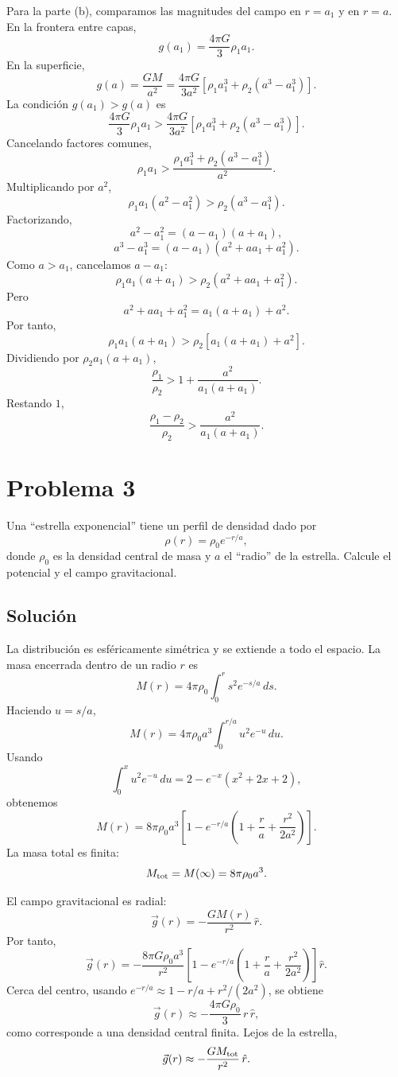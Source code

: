 \documentclass[a4paper]{article}
\begin{document}
Para la parte (b), comparamos las magnitudes del campo en $r=a_1$ y en $r=a$. En la frontera entre capas,
$$
g(a_1)=\frac{4\pi G}{3}\rho_1 a_1.
$$
En la superficie,
$$
g(a)=\frac{GM}{a^2}
=
\frac{4\pi G}{3a^2}
\left[
\rho_1 a_1^3+\rho_2(a^3-a_1^3)
\right].
$$
La condición $g(a_1)>g(a)$ es
$$
\frac{4\pi G}{3}\rho_1 a_1
>
\frac{4\pi G}{3a^2}
\left[
\rho_1 a_1^3+\rho_2(a^3-a_1^3)
\right].
$$
Cancelando factores comunes,
$$
\rho_1 a_1
>
\frac{\rho_1 a_1^3+\rho_2(a^3-a_1^3)}{a^2}.
$$
Multiplicando por $a^2$,
$$
\rho_1 a_1(a^2-a_1^2)
>
\rho_2(a^3-a_1^3).
$$
Factorizando,
$$
a^2-a_1^2=(a-a_1)(a+a_1),
$$
$$
a^3-a_1^3=(a-a_1)(a^2+a a_1+a_1^2).
$$
Como $a>a_1$, cancelamos $a-a_1$:
$$
\rho_1 a_1(a+a_1)
>
\rho_2(a^2+a a_1+a_1^2).
$$
Pero
$$
a^2+a a_1+a_1^2=a_1(a+a_1)+a^2.
$$
Por tanto,
$$
\rho_1 a_1(a+a_1)
>
\rho_2\left[a_1(a+a_1)+a^2\right].
$$
Dividiendo por $\rho_2 a_1(a+a_1)$,
$$
\frac{\rho_1}{\rho_2}
>
1+\frac{a^2}{a_1(a+a_1)}.
$$
Restando $1$,
$$
\boxed{
\frac{\rho_1-\rho_2}{\rho_2}
>
\frac{a^2}{a_1(a+a_1)}
}.
$$


\section{Problema 3}

Una “estrella exponencial” tiene un perfil de densidad dado por
$$
\rho(r)=\rho_0 e^{-r/a},
$$
donde $\rho_0$ es la densidad central de masa y $a$ el “radio” de la estrella. Calcule el potencial y el campo gravitacional.

\subsection{Solución}
La distribución es esféricamente simétrica y se extiende a todo el espacio. La masa encerrada dentro de un radio $r$ es
$$
M(r)=4\pi\rho_0\int_0^r s^2 e^{-s/a}\,ds.
$$
Haciendo $u=s/a$,
$$
M(r)=4\pi\rho_0 a^3\int_0^{r/a} u^2 e^{-u}\,du.
$$
Usando
$$
\int_0^x u^2 e^{-u}\,du
=
2-e^{-x}(x^2+2x+2),
$$
obtenemos
$$
M(r)
=
8\pi\rho_0 a^3
\left[
1-e^{-r/a}
\left(
1+\frac{r}{a}+\frac{r^2}{2a^2}
\right)
\right].
$$
La masa total es finita:
$$
M_{\rm tot}=M(\infty)=8\pi\rho_0 a^3.
$$

El campo gravitacional es radial:
$$
\vec g(r)=-\frac{G M(r)}{r^2}\,\hat r.
$$
Por tanto,
$$
\boxed{
\vec g(r)
=
-\frac{8\pi G\rho_0 a^3}{r^2}
\left[
1-e^{-r/a}
\left(
1+\frac{r}{a}+\frac{r^2}{2a^2}
\right)
\right]\hat r
}.
$$
Cerca del centro, usando $e^{-r/a}\approx 1-r/a+r^2/(2a^2)$, se obtiene
$$
\vec g(r)\approx -\frac{4\pi G\rho_0}{3}\,r\,\hat r,
$$
como corresponde a una densidad central finita. Lejos de la estrella,
$$
\vec g(r)\approx -\frac{G M_{\rm tot}}{r^2}\,\hat r.
$$
\end{document}
